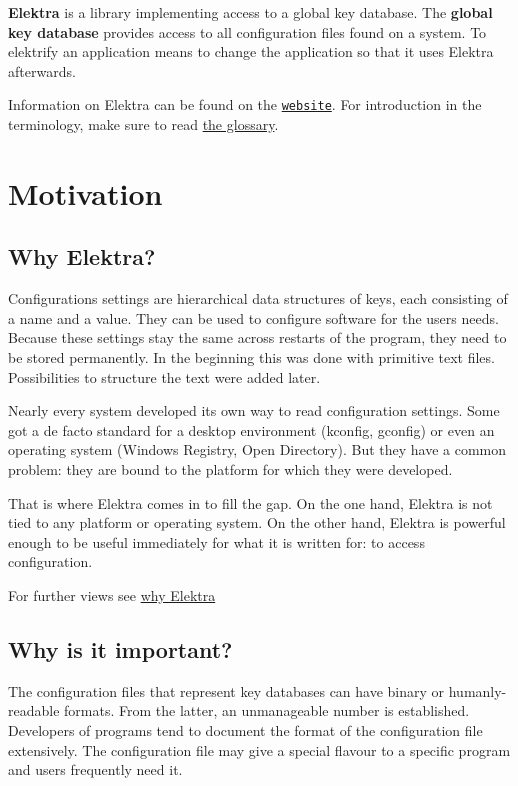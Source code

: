 {\bfseries Elektra} is a library implementing access to a global key database. The {\bfseries global key database} provides access to all configuration files found on a system. To elektrify an application means to change the application so that it uses Elektra afterwards.

Information on Elektra can be found on the \href{https://www.libelektra.org}{\tt website}. For introduction in the terminology, make sure to read \hyperlink{md_doc_help_elektra-glossary_doc_help_elektra-glossary_md}{the glossary}.\hypertarget{md_doc_help_elektra-introduction_doc_help_elektra-introduction_md}{}\section{Motivation}\label{md_doc_help_elektra-introduction_doc_help_elektra-introduction_md}
\subsection*{Why Elektra?}

Configurations settings are hierarchical data structures of keys, each consisting of a name and a value. They can be used to configure software for the user\textquotesingle{}s needs. Because these settings stay the same across restarts of the program, they need to be stored permanently. In the beginning this was done with primitive text files. Possibilities to structure the text were added later.

Nearly every system developed its own way to read configuration settings. Some got a de facto standard for a desktop environment (kconfig, gconfig) or even an operating system (Windows Registry, Open Directory). But they have a common problem\+: they are bound to the platform for which they were developed.

That is where Elektra comes in to fill the gap. On the one hand, Elektra is not tied to any platform or operating system. On the other hand, Elektra is powerful enough to be useful immediately for what it is written for\+: to access configuration.

For further views see \hyperlink{doc_WHY_md}{why Elektra}

\subsection*{Why is it important?}

The configuration files that represent key databases can have binary or humanly-\/readable formats. From the latter, an unmanageable number is established. Developers of programs tend to document the format of the configuration file extensively. The configuration file may give a special flavour to a specific program and users frequently need it.

